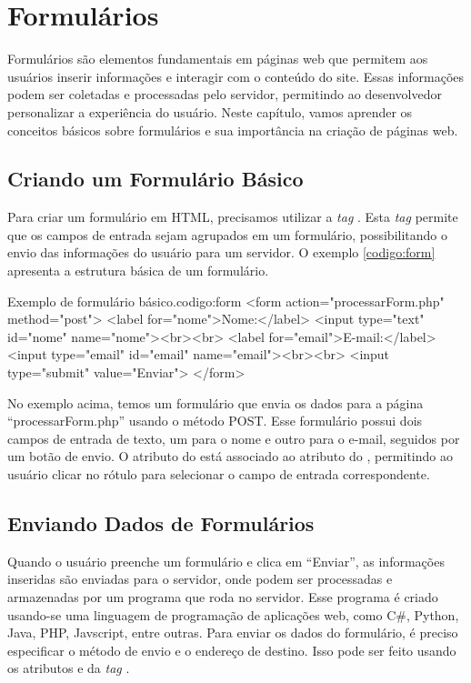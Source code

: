 \chapter{Formulários}

Formulários são elementos fundamentais em páginas web que permitem aos usuários inserir informações e interagir com o conteúdo do site. Essas informações podem ser coletadas e processadas pelo servidor, permitindo ao desenvolvedor personalizar a experiência do usuário. Neste capítulo, vamos aprender os conceitos básicos sobre formulários e sua importância na criação de páginas web.

\section{Criando um Formulário Básico}

Para criar um formulário em HTML, precisamos utilizar a \textit{tag} . Esta \textit{tag} permite que os campos de entrada sejam agrupados em um formulário, possibilitando o envio das informações do usuário para um servidor. O exemplo \ref{codigo:form} apresenta a estrutura básica de um formulário.

\begin{htmlcode}{Exemplo de formulário básico.}{codigo:form}
<form action="processarForm.php" method="post">
   <label for="nome">Nome:</label>
   <input type="text" id="nome" name="nome"><br><br>
<label for="email">E-mail:</label>
<input type="email" id="email" name="email"><br><br>
   <input type="submit" value="Enviar">
</form>
\end{htmlcode}

No exemplo acima, temos um formulário que envia os dados para a página ``processarForm.php'' usando o método POST. Esse formulário possui dois campos de entrada de texto, um para o nome e outro para o e-mail, seguidos por um botão de envio. O atributo  do  está associado ao atributo  do , permitindo ao usuário clicar no rótulo para selecionar o campo de entrada correspondente.

\section{Enviando Dados de Formulários}

Quando o usuário preenche um formulário e clica em ``Enviar'', as informações inseridas são enviadas para o servidor, onde podem ser processadas e armazenadas por um programa que roda no servidor. Esse programa é criado usando-se uma linguagem de programação de aplicações web, como C\#, Python, Java, PHP, Javscript, entre outras. Para enviar os dados do formulário, é preciso especificar o método de envio e o endereço de destino. Isso pode ser feito usando os atributos  e  da \textit{tag} .

